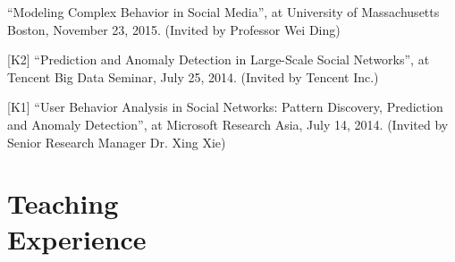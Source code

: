 \documentclass[margin, 9pt]{res}
\begin{document}
\begin{resume}
[K3] ``Modeling Complex Behavior in Social Media'', at University of Massachusetts Boston, November 23, 2015. (Invited by Professor Wei Ding)

[K2] ``Prediction and Anomaly Detection in Large-Scale Social Networks'', at Tencent Big Data Seminar, July 25, 2014. (Invited by Tencent Inc.)

[K1] ``User Behavior Analysis in Social Networks: Pattern Discovery, Prediction and Anomaly Detection'', at Microsoft Research Asia, July 14, 2014. (Invited by Senior Research Manager Dr. Xing Xie)


\section{Teaching \\ Experience}


\end{resume}
\end{document}
